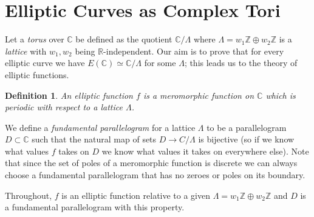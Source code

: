 \documentclass{article}
\newtheorem*{definition}{Definition}
\theoremstyle{remark}
\begin{document}
\section{Elliptic Curves as Complex Tori}
Let a \textit{torus} over $\mathbb{C}$ be defined as the quotient $\mathbb{C}/\Lambda$ where $\Lambda=w_1\mathbb{Z}\oplus w_2\mathbb{Z}$ is a \textit{lattice} with $w_1,w_2$ being $\mathbb{R}$-independent. Our aim is to prove that for every elliptic curve we have $E(\mathbb{C})\simeq \mathbb{C}/\Lambda$ for some $\Lambda$; this leads us to the theory of elliptic functions.

\begin{definition}
An elliptic function $f$ is a meromorphic function on $\mathbb{C}$ which is periodic with respect to a lattice $\Lambda$. 
\end{definition}
We define a \textit{fundamental parallelogram} for a lattice $\Lambda$ to be a parallelogram $D \subset \mathbb{C}$ such that the natural map of sets $D\to C/ \Lambda$ is bijective (so if we know what values $f$ takes on $D$ we know what values it takes on everywhere else). Note that since the set of poles of a meromorphic function is discrete we can always choose a fundamental parallelogram that has no zeroes or poles on its boundary. 

Throughout, $f$ is an elliptic function relative to a given $\Lambda=w_1\mathbb{Z}\oplus w_2\mathbb{Z}$ and $D$ is a fundamental parallelogram with this property.
\end{document}

